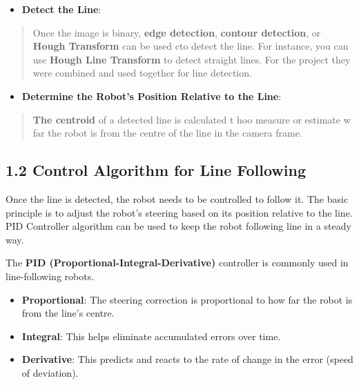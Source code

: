 \documentclass[../../main]{subfiles}
\begin{document}
    \begin{itemize}
    \item
      \textbf{Detect the Line}:
    \end{itemize}
    
    \begin{quote}
    Once the image is binary, \textbf{edge detection}, \textbf{contour
    detection}, or \textbf{Hough Transform} can be used cto detect the line.
    For instance, you can use \textbf{Hough Line Transform} to detect
    straight lines. For the project they were combined and used together for
    line detection.
    \end{quote}
    
    \begin{itemize}
    \item
      \textbf{Determine the Robot's Position Relative to the Line}:
    \end{itemize}
    
    \begin{quote}
    \textbf{The centroid} of a detected line is calculated t hoo measure or
    estimate w far the robot is from the centre of the line in the camera
    frame.
    \end{quote}
    
    \subsection{1.2 Control Algorithm for Line Following}
    
    Once the line is detected, the robot needs to be controlled to follow
    it. The basic principle is to adjust the robot's steering based on its
    position relative to the line. PID Controller algorithm can be used to
    keep the robot following line in a steady way.
    
    The \textbf{PID (Proportional-Integral-Derivative)} controller is
    commonly used in line-following robots.
    
    \begin{itemize}
    \item
      \textbf{Proportional}: The steering correction is proportional to how
      far the robot is from the line's centre.
    \item
      \textbf{Integral}: This helps eliminate accumulated errors over time.
    \item
      \textbf{Derivative}: This predicts and reacts to the rate of change in
      the error (speed of deviation).
    \end{itemize}
    
\end{document}
